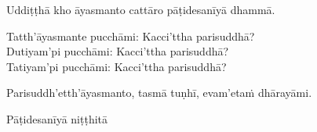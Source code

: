 \medskip

\begin{center}
Uddiṭṭhā kho āyasmanto cattāro pāṭidesanīyā dhammā.

\smallskip

Tatth'āyasmante pucchāmi: Kacci'ttha parisuddhā?\\
Dutiyam'pi pucchāmi: Kacci'ttha parisuddhā?\\
Tatiyam'pi pucchāmi: Kacci'ttha parisuddhā?

\smallskip

Parisuddh'etth'āyasmanto, tasmā tuṇhī, evam'etaṁ dhārayāmi.
\end{center}

\begin{outro}
  Pāṭidesanīyā niṭṭhitā
\end{outro}

\clearpage
